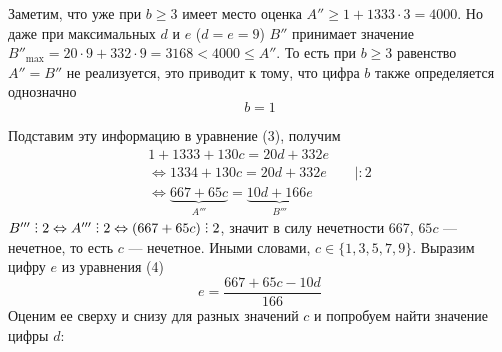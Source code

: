 \documentclass[12pt]{article}
\DeclareRobustCommand{\divby}{%
  \mathrel{\vbox{\baselineskip.65ex\lineskiplimit0pt\hbox{.}\hbox{.}\hbox{.}}}%
}
\begin{document}
    Заметим, что уже при $b \geqslant 3$ имеет место оценка $A'' \geqslant 1 + 1333\cdot3 = 4000$. Но даже при максимальных $d$ и $e$ ($d = e = 9$) $B''$ принимает значение $B''_{\max} = 20\cdot9 + 332\cdot9 = 3168 < 4000 \leqslant A''$. То есть при $b \geqslant 3$ равенство $A'' = B''$ не реализуется, это приводит к тому, что цифра $b$ также определяется однозначно
    $$
        \boxed{b = 1}
    $$

    Подставим эту информацию в уравнение (3), получим
    \begin{gather}
        1 + 1333 + 130c = 20d + 332e \nonumber \\
        \Longleftrightarrow 1334 + 130c = 20d + 332e \qquad |:2 \nonumber \\
        \Longleftrightarrow \underbrace{667 + 65c}_{A'''} = \underbrace{10d + 166e}_{B'''}
    \end{gather}
    $B''' \divby 2 \Leftrightarrow A''' \divby 2 \Leftrightarrow (667 + 65c) \divby 2$, значит в силу нечетности 667, $65c$ — нечетное, то есть $c$ — нечетное.
    Иными словами, $c \in \{1, 3, 5, 7, 9\}$. Выразим цифру $e$ из уравнения (4)
    $$
        e = \frac{667 + 65c - 10d}{166}
    $$
    Оценим ее сверху и снизу для разных значений $c$ и попробуем найти значение цифры $d$:
\end{document}
